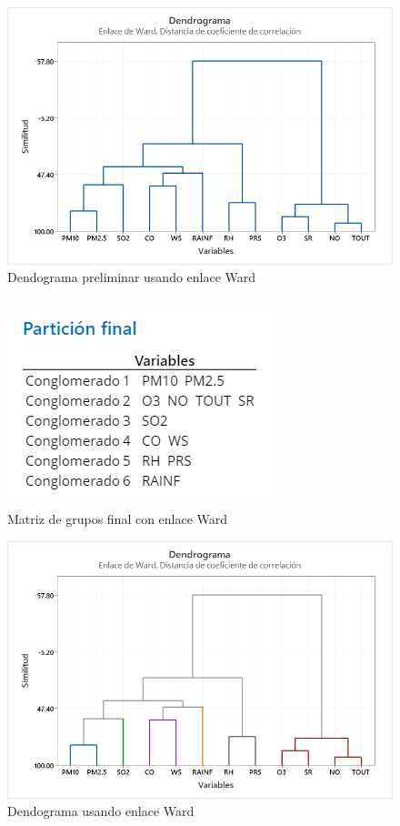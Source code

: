 \documentclass[journal, 10pt]{IEEEtran}                                                          %
\begin{document}
\begin{figure}[H]
    \centering
    \includegraphics[scale=.3]{gramaWard.png}
    \caption{Dendograma preliminar usando enlace Ward}
    \label{fig:gramaWard}
\end{figure}

\begin{figure}[H]
    \centering
    \includegraphics[scale=.3]{matrizWardFinal.png}
    \caption{Matriz de grupos final con enlace Ward}
    \label{fig:matrizWardFinal}
\end{figure}

\begin{figure}[H]
    \centering
    \includegraphics[scale=.3]{dendogramaWard.png}
    \caption{Dendograma usando enlace Ward}
    \label{fig:dendogramaWard}
\end{figure}
\end{document}
